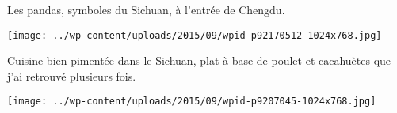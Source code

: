  Les pandas, symboles du Sichuan, à l'entrée de Chengdu. 
\begin{center} \texttt{[image: ../wp-content/uploads/2015/09/wpid-p92170512-1024x768.jpg]} \end{center}

\pagebreak
 Cuisine bien pimentée dans le Sichuan, plat à base de poulet et cacahuètes que j'ai retrouvé plusieurs fois. 
\begin{center} \texttt{[image: ../wp-content/uploads/2015/09/wpid-p9207045-1024x768.jpg]} \end{center}
